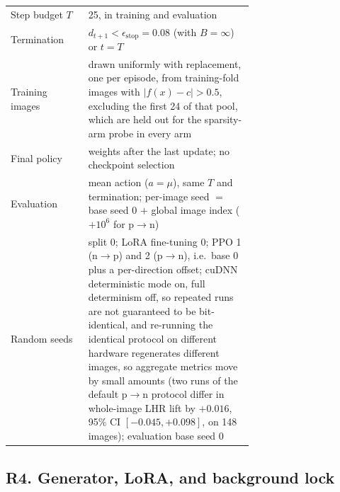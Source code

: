 \begin{table}[t]
\begin{tabular}{@{}l p{0.68\linewidth}@{}}
Step budget $T$ & 25, in training and evaluation \\
Termination & $d_{t+1} < \epsilon_{\text{stop}} = 0.08$ (with $B = \infty$) or $t = T$ \\
Training images & drawn uniformly with replacement, one per episode, from training-fold images with $|f(x) - c| > 0.5$, excluding the first 24 of that pool, which are held out for the sparsity-arm probe in every arm \\
Final policy & weights after the last update; no checkpoint selection \\
Evaluation & mean action ($a = \mu$), same $T$ and termination; per-image seed $=$ base seed 0 $+$ global image index ($+10^6$ for p$\to$n) \\
Random seeds & split 0; LoRA fine-tuning 0; PPO 1 (n$\to$p) and 2 (p$\to$n), i.e.\ base 0 plus a per-direction offset; cuDNN deterministic mode on, full determinism off, so repeated runs are not guaranteed to be bit-identical, and re-running the identical protocol on different hardware regenerates different images, so aggregate metrics move by small amounts (two runs of the default p$\to$n protocol differ in whole-image LHR lift by $+0.016$, 95\% CI $[-0.045, +0.098]$, on 148 images); evaluation base seed 0 \\
\bottomrule
\end{tabular}
\end{table}

\subsection*{R4. Generator, LoRA, and background lock}
\label{sec:repro-gen}

